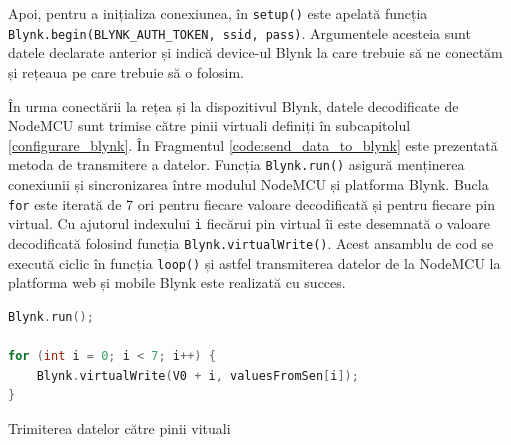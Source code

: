 Apoi, pentru a inițializa conexiunea, în \texttt{setup()} este apelată funcția \texttt{Blynk.begin(BLYNK\_AUTH\_TOKEN, ssid, pass)}. Argumentele acesteia sunt datele declarate anterior și indică device-ul Blynk la care trebuie să ne conectăm și rețeaua pe care trebuie să o folosim. 

În urma conectării la rețea și la dispozitivul Blynk, datele decodificate de NodeMCU sunt trimise către pinii virtuali definiți în subcapitolul \ref{configurare_blynk}. În Fragmentul \ref{code:send_data_to_blynk} este prezentată metoda de transmitere a datelor. Funcția \texttt{Blynk.run()} asigură menținerea conexiunii și sincronizarea între modulul NodeMCU și platforma Blynk. Bucla \texttt{for} este iterată de 7 ori pentru fiecare valoare decodificată și pentru fiecare pin virtual. Cu ajutorul indexului \texttt{i} fiecărui pin virtual îi este desemnată o valoare decodificată folosind funcția \texttt{Blynk.virtualWrite()}. Acest ansamblu de cod se execută ciclic în funcția \texttt{loop()} și astfel transmiterea datelor de la NodeMCU la platforma web și mobile Blynk este realizată cu succes.

\begin{code}[H]
\begin{lstlisting}[language=C++]
Blynk.run();

for (int i = 0; i < 7; i++) {
    Blynk.virtualWrite(V0 + i, valuesFromSen[i]);
}
\end{lstlisting}
\caption{Trimiterea datelor către pinii vituali}
\label{code:send_data_to_blynk}
\end{code}
